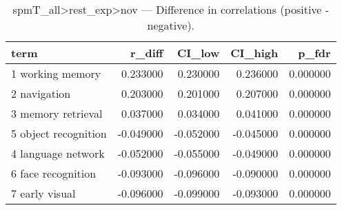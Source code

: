 \begin{table}
\caption{spmT_all>rest_exp>nov — Difference in correlations (positive - negative).}
\label{tab:spmT_all>rest_exp>nov_diff}
\begin{tabular}{lrrrr}
\toprule
term & r\_diff & CI\_low & CI\_high & p\_fdr \\
\midrule
1 working memory & 0.233000 & 0.230000 & 0.236000 & 0.000000 \\
2 navigation & 0.203000 & 0.201000 & 0.207000 & 0.000000 \\
3 memory retrieval & 0.037000 & 0.034000 & 0.041000 & 0.000000 \\
5 object recognition & -0.049000 & -0.052000 & -0.045000 & 0.000000 \\
4 language network & -0.052000 & -0.055000 & -0.049000 & 0.000000 \\
6 face recognition & -0.093000 & -0.096000 & -0.090000 & 0.000000 \\
7 early visual & -0.096000 & -0.099000 & -0.093000 & 0.000000 \\
\bottomrule
\end{tabular}
\end{table}
